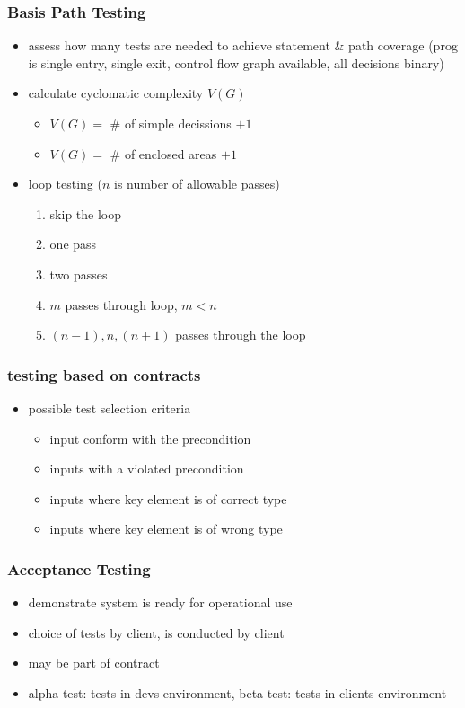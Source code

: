 \documentclass[a4paper, 10pt]{article}
\begin{document}
\subsubsection{Basis Path Testing}
\begin{itemize}
	\item assess how many tests are needed to achieve statement \& path coverage (prog is single entry, single exit, control flow graph available, all decisions binary)
	\item calculate cyclomatic complexity $V(G)$
	\begin{itemize}
		\item $V(G)=$ \# of simple decissions $+1$
		\item $V(G)=$ \# of enclosed areas $+1$
	\end{itemize}
	\item loop testing ($n$ is number of allowable passes)
	\begin{enumerate}
		\item skip the loop
		\item one pass
		\item two passes
		\item $m$ passes through loop, $m<n$
		\item $(n-1), n, (n+1)$ passes through the loop
	\end{enumerate}
\end{itemize}

\subsubsection{testing based on contracts}
\begin{itemize}
	\item possible test selection criteria
	\begin{itemize}
		\item input conform with the precondition
		\item inputs with a violated precondition
		\item inputs where key element is of correct type
		\item inputs where key element is of wrong type
	\end{itemize}
\end{itemize}

\subsubsection{Acceptance Testing}
\begin{itemize}
	\item demonstrate system is ready for operational use
	\item choice of tests by client, is conducted by client
	\item may be part of contract
	\item alpha test: tests in devs environment, beta test: tests in clients environment
\end{itemize}
\end{document}
